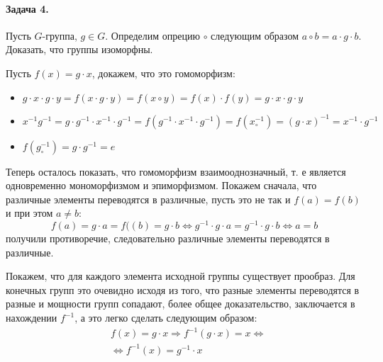 \documentclass[a4paper,12pt]{article}
\begin{document}
\paragraph{Задача 4.} Пусть $G$-группа, $g \in G$. Определим опрецию $\circ$ следующим образом $a \circ b = a \cdot g\cdot b$. Доказать, что группы изоморфны.

\begin{Solution}
Пусть $f\left(x\right) = g\cdot x$, докажем, что это гомоморфизм:
\begin{itemize}
\item $g \cdot x \cdot g \cdot y = f\left(x\cdot g\cdot y\right) = f(x \circ y) = f\left(x\right) \cdot f\left(y\right) = g \cdot x \cdot g \cdot y$

\item $x^{-1} g^{-1} = g \cdot g^{-1} \cdot x^{-1} \cdot g^{-1}  = f\left(g^{-1} \cdot x^{-1} \cdot g^{-1}\right) = f\left(x^{-1}_{\circ} \right) = {\left(g \cdot x\right)}^{-1} = x^{-1} \cdot g^{-1}$

\item $f\left(g^{-1}_{\circ}\right) = g \cdot g^{-1} = e$
\end{itemize}
Теперь осталось показать, что гомоморфизм взаимооднозначный, т. е является одновременно мономорфизмом и эпиморфизмом. Покажем сначала, что различные элементы переводятся в различные, пусть это не так и $f\left(a\right) = f\left(b\right)$ и при этом $a \not= b$:
\[
	f\left(a\right) = g \cdot a = f(\left(b\right) = g \cdot b \Leftrightarrow g^{-1} \cdot g \cdot a = g^{-1} \cdot g \cdot b \Leftrightarrow a = b
\]
получили противоречие, следовательно различные элементы переводятся в различные.

Покажем, что для каждого элемента исходной группы существует прообраз. Для конечных групп это очевидно исходя из того, что разные элементы переводятся в разные и мощности групп сопадают, более общее доказательство, заключается в нахождении $f^{-1}$, а это легко сделать следующим образом:
\[
	\begin{split}
		& f\left(x\right) = g \cdot x \Rightarrow f^{-1}\left(g \cdot x\right) = x \Leftrightarrow \\
		& \Leftrightarrow f^{-1}\left(x\right) = g^{-1} \cdot x
	\end{split}
\]
\end{Solution}
\end{document}
